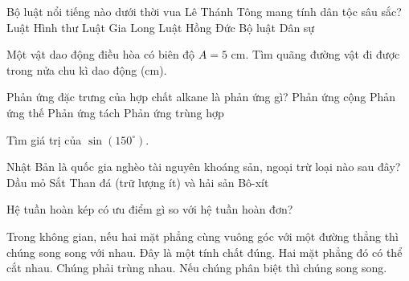 \begin{ex}
    Bộ luật nổi tiếng nào dưới thời vua Lê Thánh Tông mang tính dân tộc sâu sắc?
    \choice
    {Luật Hình thư}
    {Luật Gia Long}
    {\True Luật Hồng Đức}
    {Bộ luật Dân sự}
\end{ex}

\begin{ex}
    Một vật dao động điều hòa có biên độ $A=5$ cm. Tìm quãng đường vật đi được trong nửa chu kì dao động (cm).
\end{ex}

\begin{ex}
    Phản ứng đặc trưng của hợp chất alkane là phản ứng gì?
    \choice
    {Phản ứng cộng}
    {\True Phản ứng thế}
    {Phản ứng tách}
    {Phản ứng trùng hợp}
\end{ex}

\begin{ex}
    Tìm giá trị của $\sin(150^\circ)$.
\end{ex}

\begin{ex}
    Nhật Bản là quốc gia nghèo tài nguyên khoáng sản, ngoại trừ loại nào sau đây?
    \choice
    {Dầu mỏ}
    {Sắt}
    {\True Than đá (trữ lượng ít) và hải sản}
    {Bô-xít}
\end{ex}

\begin{ex}
    Hệ tuần hoàn kép có ưu điểm gì so với hệ tuần hoàn đơn?
\end{ex}

\begin{ex}
    Trong không gian, nếu hai mặt phẳng cùng vuông góc với một đường thẳng thì chúng song song với nhau.
    \choiceTF
    {\True Đây là một tính chất đúng.}
    {Hai mặt phẳng đó có thể cắt nhau.}
    {Chúng phải trùng nhau.}
    {\True Nếu chúng phân biệt thì chúng song song.}
    \loigiai{
        \begin{itemchoice}
        \itemch 
        \itemch 
        \itemch 
        \itemch 
        \end{itemchoice}
    }
\end{ex}


